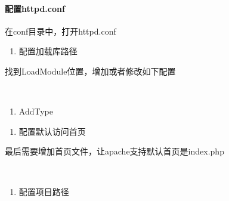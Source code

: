 \documentclass[a4,10pt,oneside,english]{sphinxmanual}
\begin{document}
\paragraph{配置httpd.conf}
\label{\detokenize{interface/thinkPHP:httpd-conf}}
在conf目录中，打开httpd.conf
\begin{enumerate}
%
\item {} 
配置加载库路径

\end{enumerate}

找到LoadModule位置，增加或者修改如下配置

\begin{sphinxVerbatim}[commandchars=\\\{\}]
         
 
\end{sphinxVerbatim}
\begin{enumerate}
%
\setcounter{enumi}{1}
\item {} 
AddType

\end{enumerate}

\begin{sphinxVerbatim}[commandchars=\\\{\}]
  
\end{sphinxVerbatim}
\begin{enumerate}
%
\setcounter{enumi}{2}
\item {} 
配置默认访问首页

\end{enumerate}

最后需要增加首页文件，让apache支持默认首页是index.php

\begin{sphinxVerbatim}[commandchars=\\\{\}]
 
      
\end{sphinxVerbatim}
\begin{enumerate}
%
\setcounter{enumi}{3}
\item {} 
配置项目路径

\end{enumerate}
\end{document}
